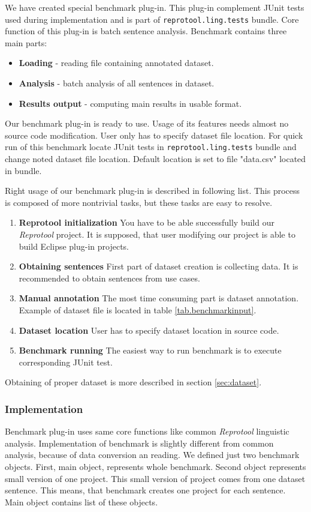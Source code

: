 We have created special benchmark plug-in. This plug-in complement JUnit tests used during implementation and is part of {\tt reprotool.ling.tests} bundle. Core function of this plug-in is batch sentence analysis. Benchmark contains three main parts:

\begin{itemize}
\item {\bf Loading} - reading file containing annotated dataset.
\item {\bf Analysis} - batch analysis of all sentences in dataset.
\item {\bf Results output} - computing main results in usable format.
\end{itemize}

Our benchmark plug-in is ready to use. Usage of its features needs almost no source code modification. User only has to specify dataset file location. For quick run of this benchmark locate JUnit tests in {\tt reprotool.ling.tests} bundle and change noted dataset file location. Default location is set to file "data.csv" located in bundle.

Right usage of our benchmark plug-in is described in following list. This process is composed of more nontrivial tasks, but these tasks are easy to resolve.

\begin{enumerate}
\item {\bf Reprotool initialization} You have to be able successfully build our \emph{Reprotool} project. It is supposed, that user modifying our project is able to build Eclipse plug-in projects.
\item {\bf Obtaining sentences} First part of dataset creation is collecting data. It is recommended to obtain sentences from use cases.
\item {\bf Manual annotation} The most time consuming part is dataset annotation. Example of dataset file is located in table \ref{tab.benchmarkinput}.
\item {\bf Dataset location} User has to specify dataset location in source code.
\item {\bf Benchmark running} The easiest way to run benchmark is to execute corresponding JUnit test.
\end{enumerate}

Obtaining of proper dataset is more described in section \ref{sec:dataset}. 

\subsubsection{Implementation}
Benchmark plug-in uses same core functions like common \emph{Reprotool} linguistic analysis. Implementation of benchmark is slightly different from common analysis, because of data conversion an reading. We defined just two benchmark objects. First, main object, represents whole benchmark. Second object represents small version of one project. This small version of project comes from one dataset sentence. This means, that benchmark creates one project for each sentence. Main object contains list of these objects.

